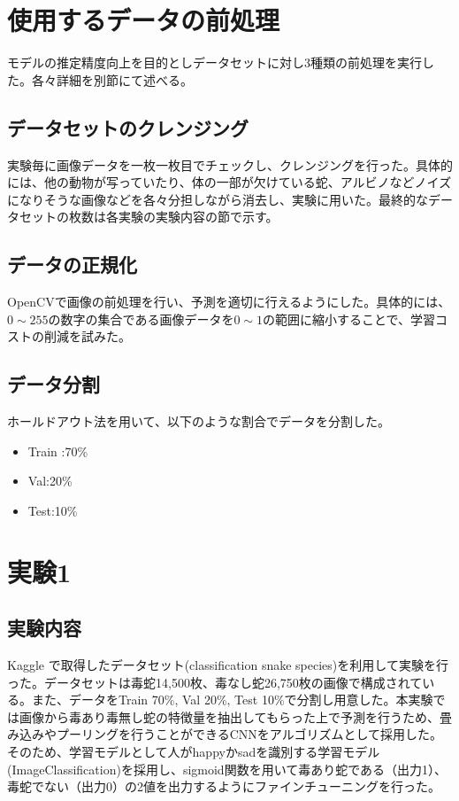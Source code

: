 \documentclass[a4paper, 11pt, titlepage]{jsarticle}
\begin{document}
\section{使用するデータの前処理}
モデルの推定精度向上を目的としデータセットに対し3種類の前処理を実行した。各々詳細を別節にて述べる。

\subsection{データセットのクレンジング}
実験毎に画像データを一枚一枚目でチェックし、クレンジングを行った。具体的には、他の動物が写っていたり、体の一部が欠けている蛇、アルビノなどノイズになりそうな画像などを各々分担しながら消去し、実験に用いた。最終的なデータセットの枚数は各実験の実験内容の節で示す。

\subsection{データの正規化}
OpenCVで画像の前処理を行い、予測を適切に行えるようにした。具体的には、$0\sim255$の数字の集合である画像データを$0\sim1$の範囲に縮小することで、学習コストの削減を試みた。

\subsection{データ分割}
ホールドアウト法を用いて、以下のような割合でデータを分割した。\par
\begin{itemize}
\item Train :70\%
\item Val:20\%
\item Test:10\%
\end{itemize}

\section{実験1}
\subsection{実験内容}
Kaggle で取得したデータセット(classification snake species\cite{theme3})を利用して実験を行った。データセットは毒蛇14,500枚、毒なし蛇26,750枚の画像で構成されている。また、データをTrain 70\%, Val 20\%, Test 10\%で分割し用意した。本実験では画像から毒あり毒無し蛇の特徴量を抽出してもらった上で予測を行うため、畳み込みやプーリングを行うことができるCNNをアルゴリズムとして採用した。そのため、学習モデルとして人がhappyかsadを識別する学習モデル(ImageClassification\cite{theme4})を採用し、sigmoid関数を用いて毒あり蛇である（出力1）、毒蛇でない（出力0）の2値を出力するようにファインチューニングを行った。\par
\end{document}
